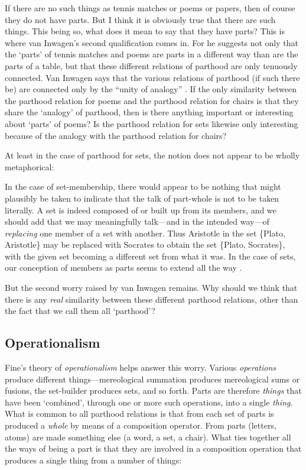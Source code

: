 \documentclass[11pt]{article}
\newenvironment{squote}{%
\begin{spacing}{1}
\begin{list}{}{%
\setlength{\labelwidth}{0pt}%
\rightmargin\leftmargin%
}
\item\relax
}{%
\end{list}%
\end{spacing}
}
\begin{document}
\begin{spacing}{1.5}
If there are no such things as tennis matches or poems or papers, then
of course they do not have parts.  But I think it is obviously true
that there are such things.  This being so, what does it mean to say
that they have parts?  This is where van Inwagen's second
qualification comes in.  For he suggests not only that the `parts' of
tennis matches and poems are parts in a different way than are the
parts of a table, but that these different relations of parthood are
only tenuously connected.  Van Inwagen says that the various relations
of parthood (if such there be) are connected only by the ``unity of
analogy'' \citeyearpar[19]{inwagen1995}.  If the only similarity
between the parthood relation for poems and the parthood relation for
chairs is that they share the `analogy' of parthood, then is there
anything important or interesting about `parts' of poems?  Is the
parthood relation for sets likewise only interesting because of the
analogy with the parthood relation for chairs?

At least in the case of parthood for sets, the notion does not appear
to be wholly metaphorical:

\begin{squote}
In the case of set-membership, there would appear to be nothing that
might plausibly be taken to indicate that the talk of part-whole is
not to be taken literally. A set is indeed composed of or built up
from its members, and we should add that we may meaningfully
talk---and in the intended way---of \emph{replacing} one member of a
set with another.  Thus Aristotle in the set \{Plato, Aristotle\} may
be replaced with Socrates to obtain the set \{Plato, Socrates\}, with
the given set becoming a different set from what it was. In the case
of sets, our conception of members as parts seems to extend all the
way \citep[564]{fine2010}.
\end{squote}

But the second worry raised by van Inwagen remains.  Why should we
think that there is any {\em real} similarity between these different
parthood relations, other than the fact that we call them all
`parthood'?

\subsection{Operationalism}
\label{operation}
Fine's theory of {\em operationalism} helps answer this worry.
Various {\em operations} produce different things---mereological
summation produces mereological sums or fusions, the set-builder
produces sets, and so forth.  Parts are therefore {\em things} that
have been `combined', through one or more such operations, into a
single {\em thing}.  What is common to all parthood relations is that
from each set of parts is produced a {\em whole} by means of a
composition operator.  From parts (letters, atoms) are made something
else (a word, a set, a chair).  What ties together all the ways of
being a part is that they are involved in a composition operation that
produces a single thing from a number of things:


\end{spacing}
\end{document}
